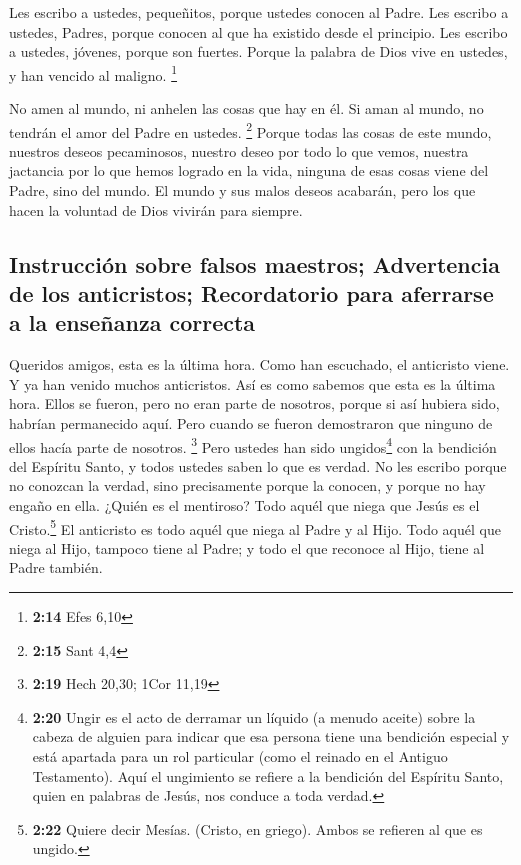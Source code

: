  Les escribo a ustedes, pequeñitos, porque ustedes
conocen al Padre. Les escribo a ustedes, Padres, porque conocen al que
ha existido desde el principio. Les escribo a ustedes, jóvenes, porque
son fuertes. Porque la palabra de Dios vive en ustedes, y han vencido al
maligno. \footnote{\textbf{2:14} Efes 6,10}

 No amen al mundo, ni anhelen las cosas que hay en él. Si
aman al mundo, no tendrán el amor del Padre en ustedes. \footnote{\textbf{2:15}
  Sant 4,4}  Porque todas las cosas de este mundo,
nuestros deseos pecaminosos, nuestro deseo por todo lo que vemos,
nuestra jactancia por lo que hemos logrado en la vida, ninguna de esas
cosas viene del Padre, sino del mundo.  El mundo y sus
malos deseos acabarán, pero los que hacen la voluntad de Dios vivirán
para siempre.

\hypertarget{instrucciuxf3n-sobre-falsos-maestros-advertencia-de-los-anticristos-recordatorio-para-aferrarse-a-la-enseuxf1anza-correcta}{%
\subsection{Instrucción sobre falsos maestros; Advertencia de los
anticristos; Recordatorio para aferrarse a la enseñanza
correcta}\label{instrucciuxf3n-sobre-falsos-maestros-advertencia-de-los-anticristos-recordatorio-para-aferrarse-a-la-enseuxf1anza-correcta}}

 Queridos amigos, esta es la última hora. Como han
escuchado, el anticristo viene. Y ya han venido muchos anticristos. Así
es como sabemos que esta es la última hora.  Ellos se
fueron, pero no eran parte de nosotros, porque si así hubiera sido,
habrían permanecido aquí. Pero cuando se fueron demostraron que ninguno
de ellos hacía parte de nosotros. \footnote{\textbf{2:19} Hech 20,30;
  1Cor 11,19}  Pero ustedes han sido ungidos\footnote{\textbf{2:20}
  Ungir es el acto de derramar un líquido (a menudo aceite) sobre la
  cabeza de alguien para indicar que esa persona tiene una bendición
  especial y está apartada para un rol particular (como el reinado en el
  Antiguo Testamento). Aquí el ungimiento se refiere a la bendición del
  Espíritu Santo, quien en palabras de Jesús, nos conduce a toda verdad.}
con la bendición del Espíritu Santo, y todos ustedes saben lo que es
verdad.  No les escribo porque no conozcan la verdad,
sino precisamente porque la conocen, y porque no hay engaño en ella.
 ¿Quién es el mentiroso? Todo aquél que niega que Jesús
es el Cristo.\footnote{\textbf{2:22} Quiere decir Mesías. (Cristo, en
  griego). Ambos se refieren al que es ungido.} El anticristo es todo
aquél que niega al Padre y al Hijo.  Todo aquél que niega
al Hijo, tampoco tiene al Padre; y todo el que reconoce al Hijo, tiene
al Padre también.

